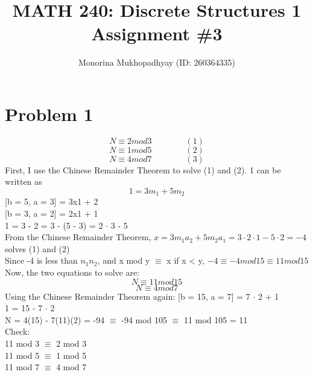 \documentclass[english]{article}
\title{MATH 240: Discrete Structures 1 Assignment \#3}
\author{Monorina Mukhopadhyay (ID: 260364335)}
\begin{document}
\maketitle
\section*{Problem 1}
 $$ N \equiv 2 mod 3  \qquad \qquad (1)$$
 $$ N \equiv 1 mod 5  \qquad \qquad (2)$$
 $$ N \equiv 4 mod 7  \qquad \qquad (3)$$
 First, I use the Chinese Remainder Theorem to solve (1) and (2). 1 can be written as 
 $$ 1 = 3 m_1 + 5 m_2$$ 
 [b = 5, a = 3]  = 3x1 + 2\\
 {}[b = 3, a = 2]  = 2x1 + 1\\
 1 = 3 - 2 = 3 - (5 - 3) = 2 $\cdot$ 3 - 5\\
 From the Chinese Remainder Theorem, $x = 3 m_1 a_2 + 5 m_2 a_1 = 3 \cdot 2 \cdot 1 - 5 \cdot 2 = -4 $ solves (1) and (2) \\ Since -4 is less than $n_1 n_2$, and x mod y $\equiv $ x if x < y, $-4 \equiv -4 mod 15 \equiv 11 mod 15$
\\ 
Now, the two equations to solve are:
$$ N \equiv 11 mod 15 $$
$$ N \equiv 4 mod 7$$
Using the Chinese Remainder Theorem again:
[b = 15, a = 7]  = 7 $\cdot$ 2 + 1 \\
1 = 15 - 7 $\cdot$ 2 \\
N = 4(15) - 7(11)(2)  = -94 $\equiv$ -94 mod 105 $\equiv$ 11 mod 105 = 11 \\
Check:\\
11 mod 3 $\equiv$ 2 mod 3\\
11 mod 5 $\equiv$ 1 mod 5\\
11 mod 7 $\equiv$ 4 mod 7
\end{document}
